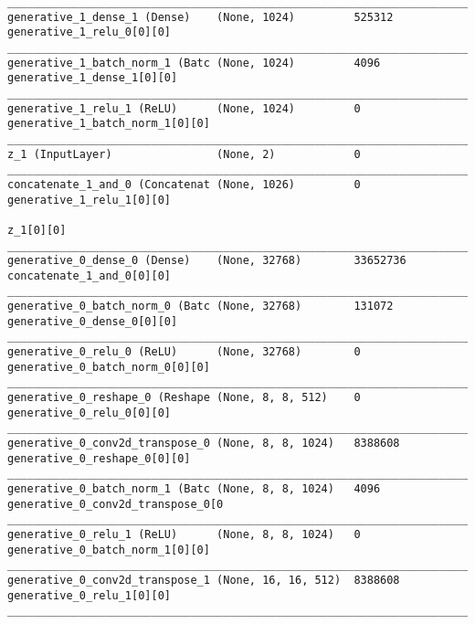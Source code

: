 \begin{lstlisting}[caption={CelebA-\ac{VLAE}-\ac{GAN} Decoder},captionpos=b,basicstyle=\tiny, label={lst:mnist-vlae-gan-decoder}]
__________________________________________________________________________________________________
generative_1_dense_1 (Dense)    (None, 1024)         525312      generative_1_relu_0[0][0]
__________________________________________________________________________________________________
generative_1_batch_norm_1 (Batc (None, 1024)         4096        generative_1_dense_1[0][0]
__________________________________________________________________________________________________
generative_1_relu_1 (ReLU)      (None, 1024)         0           generative_1_batch_norm_1[0][0]
__________________________________________________________________________________________________
z_1 (InputLayer)                (None, 2)            0
__________________________________________________________________________________________________
concatenate_1_and_0 (Concatenat (None, 1026)         0           generative_1_relu_1[0][0]
                                                                 z_1[0][0]
__________________________________________________________________________________________________
generative_0_dense_0 (Dense)    (None, 32768)        33652736    concatenate_1_and_0[0][0]
__________________________________________________________________________________________________
generative_0_batch_norm_0 (Batc (None, 32768)        131072      generative_0_dense_0[0][0]
__________________________________________________________________________________________________
generative_0_relu_0 (ReLU)      (None, 32768)        0           generative_0_batch_norm_0[0][0]
__________________________________________________________________________________________________
generative_0_reshape_0 (Reshape (None, 8, 8, 512)    0           generative_0_relu_0[0][0]
__________________________________________________________________________________________________
generative_0_conv2d_transpose_0 (None, 8, 8, 1024)   8388608     generative_0_reshape_0[0][0]
__________________________________________________________________________________________________
generative_0_batch_norm_1 (Batc (None, 8, 8, 1024)   4096        generative_0_conv2d_transpose_0[0
__________________________________________________________________________________________________
generative_0_relu_1 (ReLU)      (None, 8, 8, 1024)   0           generative_0_batch_norm_1[0][0]
__________________________________________________________________________________________________
generative_0_conv2d_transpose_1 (None, 16, 16, 512)  8388608     generative_0_relu_1[0][0]
__________________________________________________________________________________________________

\end{lstlisting}
